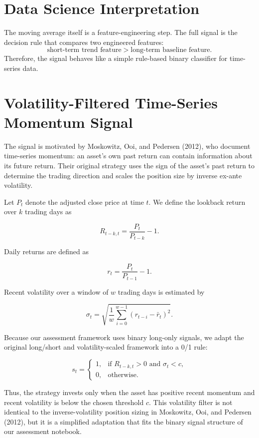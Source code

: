 \documentclass[11pt]{article}
\begin{document}
\section*{Data Science Interpretation}
The moving average itself is a feature-engineering step. The full signal is the decision rule that compares two engineered features:
\[
    \text{short-term trend feature} > \text{long-term baseline feature}.
\]
Therefore, the signal behaves like a simple rule-based binary classifier for time-series data.


\section{Volatility-Filtered Time-Series Momentum Signal}

The signal is motivated by Moskowitz, Ooi, and Pedersen (2012), who document
time-series momentum: an asset's own past return can contain information about
its future return. Their original strategy uses the sign of the asset's past
return to determine the trading direction and scales the position size by
inverse ex-ante volatility.

Let \(P_t\) denote the adjusted close price at time \(t\). We define the
lookback return over \(k\) trading days as

\[
R_{t-k,t} = \frac{P_t}{P_{t-k}} - 1.
\]

Daily returns are defined as

\[
r_t = \frac{P_t}{P_{t-1}} - 1.
\]

Recent volatility over a window of \(w\) trading days is estimated by

\[
\sigma_t =
\sqrt{
\frac{1}{w}
\sum_{i=0}^{w-1}
(r_{t-i} - \bar{r}_t)^2
}.
\]

Because our assessment framework uses binary long-only signals, we adapt the
original long/short and volatility-scaled framework into a 0/1 rule:

\[
s_t =
\begin{cases}
1, & \text{if } R_{t-k,t} > 0 \text{ and } \sigma_t < c, \\
0, & \text{otherwise}.
\end{cases}
\]

Thus, the strategy invests only when the asset has positive recent momentum and
recent volatility is below the chosen threshold \(c\). This volatility filter is
not identical to the inverse-volatility position sizing in Moskowitz, Ooi, and
Pedersen (2012), but it is a simplified adaptation that fits the binary signal
structure of our assessment notebook.
\end{document}

